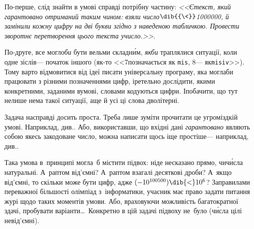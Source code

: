 \Tutorial	По-перше, слід знайти в умові справді потрібну частину: \textsl{<<Є\nolinebreak[3] текст, який гарантовано отриманий таким чином: взяли число$\dib{{\<}}$\mbox{1\hspace{0.125em}000\hspace{0.125em}000}, й замінили кожну цифру на дві букви згідно з наведеною табличкою. Провести зворотнє перетворення цього текста у\nolinebreak[3] число.>>}.

По-друге, все могло\nolinebreak[3] \emph{би} бути вельми складн\'{и}м, \emph{якби} траплялися ситуації, коли одне зі\nolinebreak[2] слів\nolinebreak[3] --- початок іншого (як-то <<7\nolinebreak[3] позначається як \texttt{mis}, 8\nolinebreak[3] --- як\nolinebreak[2] \texttt{misiv}>>). Тому варто відмовитися від ідеї писати універсальну програму, яка могла\nolinebreak[3] би працювати з різними позначеннями цифр, і\nolinebreak[3] ретельно дослідити, якими конкретними, заданими в\nolinebreak[3] умові, словами кодуються цифри. І\nolinebreak[3] побачити, що тут не\nolinebreak[3] лише нема такої ситуації, а\nolinebreak[3] ще й усі ці слова дволітерні. 

Задача насправді досить проста. Треба лише зуміти прочитати це у\nolinebreak[3] громіздкій умові. Наприклад, див.\nolinebreak[2] . Або, використавши, що вхідні дані \emph{гарантовано} являють собою якесь закодоване число, можна написати щось іще простіше\nolinebreak[3] --- наприклад, див.\nolinebreak[3] .

Така умова в~принципі могла~б містити підвох: ніде не\nolinebreak[3] сказано прямо, чи\nolinebreak[3] ч\'{и}сла натуральні. А~раптом від'ємні? А~раптом взагалі десяткові дроби? А~якщо від'ємні, то скільки може бути цифр, адже ${({-}10^{100500})\dib{{<}}10^6}$? За\nolinebreak[3] правилами переважної більшості олімпіад з~інформатики, учасник має право задати питання журі щодо таких моментів умови. Або, враховуючи можливість багатократної здачі, пробувати варіанти\dots\ Конкретно в цій задачі %
підвоху не~було (ч\'{и}сла %
цілі невід'ємні).